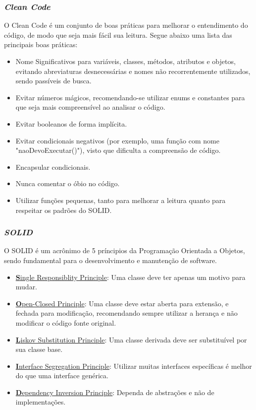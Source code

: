 \subsubsection{\emph{Clean Code}}

O Clean Code é um conjunto de boas práticas para melhorar o entendimento do código, de modo que seja mais fácil sua leitura. Segue abaixo uma lista das principais boas práticas:

\begin{itemize}
	\item Nome Significativos para variáveis, classes, métodos, atributos e objetos, evitando abreviaturas desnecessárias e nomes não recorrentemente utilizados, sendo passíveis de busca.
	\item Evitar números mágicos, recomendando-se utilizar enums e constantes para que seja mais compreensível ao analisar o código.
	\item Evitar booleanos de forma implícita.
	\item Evitar condicionais negativos (por exemplo, uma função com nome "naoDevoExecutar()"), visto que dificulta a compreensão de código.
	\item Encapsular condicionais.
	\item Nunca comentar o óbio no código.
	\item Utilizar funções pequenas, tanto para melhorar a leitura quanto para respeitar os padrões do SOLID.
\end{itemize}

\subsubsection{\emph{SOLID}}

O SOLID é um acrônimo de 5 príncipios da Programação Orientada a Objetos, sendo fundamental para o desenvolvimento e manutenção de software.

\begin{itemize}
	\item \underline{\textbf{S}ingle Responsiblity Principle}: Uma classe deve ter apenas um motivo para mudar.
	\item \underline{\textbf{O}pen-Closed Principle}: Uma classe deve estar aberta para extensão, e fechada para modificação, recomendando sempre utilizar a herança e não modificar o código fonte original.
	\item \underline{\textbf{L}iskov Substitution Principle}: Uma classe derivada deve ser substituível por sua classe base.
	\item \underline{\textbf{I}nterface Segregation Principle}: Utilizar muitas interfaces específicas é melhor do que uma interface genérica.
	\item \underline{\textbf{D}ependency Inversion Principle}: Dependa de abstrações e não de implementações.
\end{itemize}

